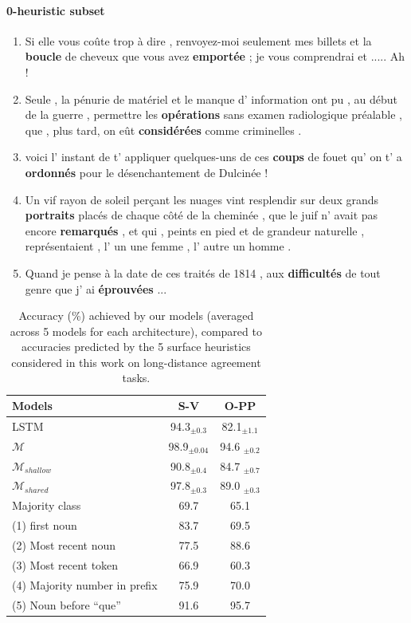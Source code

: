 \paragraph{0-heuristic subset}
\begin{enumerate}[itemsep=0pt,label=\arabic*).]
    \item Si elle vous coûte trop à dire , renvoyez-moi seulement mes billets et la \textbf{boucle} de cheveux que vous avez \textbf{emportée} ; je vous comprendrai et ..... Ah !
    \item Seule , la pénurie de matériel et le manque d' information ont pu , au début de la guerre , permettre les \textbf{opérations} sans examen radiologique préalable , que , plus tard, on eût \textbf{considérées} comme criminelles .
    \item voici l' instant de t' appliquer quelques-uns de ces \textbf{coups} de fouet qu' on t' a \textbf{ordonnés} pour le désenchantement de Dulcinée !
    \item Un vif rayon de soleil perçant les nuages vint resplendir sur deux grands \textbf{portraits} placés de chaque côté de la cheminée , que le juif n' avait pas encore \textbf{remarqués} , et qui , peints en pied et de grandeur naturelle , représentaient , l' un une femme , l' autre un homme .
    \item Quand je pense à la date de ces traités de 1814 , aux \textbf{difficultés} de tout genre que j' ai \textbf{éprouvées} ...
\end{enumerate}


\begin{table}[ht]
\centering
  \begin{tabular}{lcc}
    \toprule
    Models  & S-V & O-PP  \\
    \midrule
    LSTM & 94.3$_{\pm 0.3}$ & 82.1$_{\pm 1.1}$\\
    $\mathcal{M}$ & 98.9$_{\pm 0.04}$ & 94.6 $_{\pm 0.2}$\\
    $\mathcal{M}_{shallow}$ & 90.8$_{\pm 0.4}$ & 84.7 $_{\pm 0.7}$\\
    $\mathcal{M}_{shared}$ & 97.8$_{\pm 0.3}$ & 89.0 $_{\pm 0.3}$\\
    \midrule
    Majority class & 69.7 & 65.1 \\
    \midrule
    (1) first noun     & 83.7   & 69.5 \\
    (2) Most recent noun   &77.5      & 88.6 \\
    (3) Most recent token   &66.9     & 60.3 \\
    (4) Majority number in prefix  &75.9 & 70.0     \\
    (5) Noun before “que” & 91.6 & 95.7  \\
    \bottomrule
  \end{tabular}
\caption{Accuracy (\%) achieved by our models (averaged across 5 models for each architecture), compared to accuracies predicted by the 5 surface heuristics considered in
  this work on long-distance agreement tasks. \label{tab:h_accu}}
\centering
\end{table}

